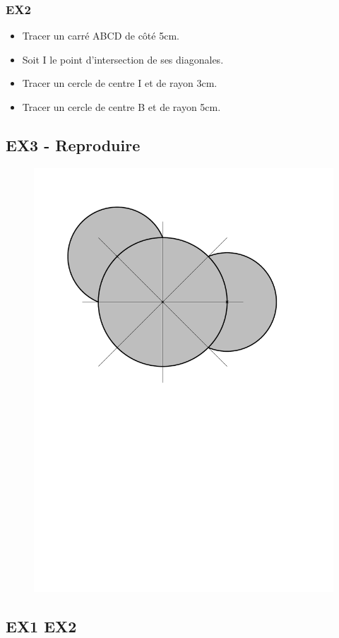 \documentclass[11pt]{article}
\begin{document}
\subsubsection*{EX2}
	\begin{itemize}
	\item Tracer un carré ABCD de côté 5cm.
	\item Soit I le point d'intersection de ses diagonales.
	\item Tracer un cercle de centre I et de rayon 3cm.
	\item Tracer un cercle de centre B et de rayon 5cm.
	\end{itemize}



\subsection*{EX3 - Reproduire}
	\begin{figure}[H]
		\centering
		\includegraphics[width=0.6\linewidth]{6x6-cercles/sources/mol1.pdf}
	\end{figure}


\newpage

\subsection*{EX1 \hspace{10cm} EX2} 


\vspace{12cm}
\end{document}
